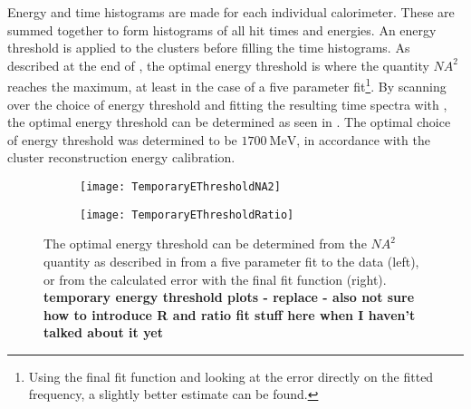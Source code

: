 Energy and time histograms are made for each individual calorimeter. These are summed together to form histograms of all hit times and energies. An energy threshold is applied to the clusters before filling the time histograms. As described at the end of , the optimal energy threshold is where the quantity $NA^{2}$ reaches the maximum, at least in the case of a five parameter fit\footnote{Using the final fit function and looking at the error directly on the fitted \wa frequency, a slightly better estimate can be found.}. By scanning over the choice of energy threshold and fitting the resulting time spectra with , the optimal energy threshold can be determined as seen in . The optimal choice of energy threshold was determined to be $\SI{1700}{\MeV}$, in accordance with the cluster reconstruction energy calibration. 

    \begin{figure}[]
    \centering
        \begin{subfigure}[t]{0.45\textwidth}
            \centering
            \texttt{[image: TemporaryEThresholdNA2]}
            \caption{}
        \end{subfigure}
        \begin{subfigure}[t]{0.45\textwidth}
            \centering
            \texttt{[image: TemporaryEThresholdRatio]}
            \caption{}
        \end{subfigure}%
    \caption[Determination of optimal energy threshold]{The optimal energy threshold can be determined from the $NA^{2}$ quantity as described in  from a five parameter fit to the data (left), or from the calculated error with the final fit function (right). \textbf{temporary energy threshold plots - replace - also not sure how to introduce R and ratio fit stuff here when I haven't talked about it yet}}
    \label{fig:OptimalEnergyThreshold}
    \end{figure}



